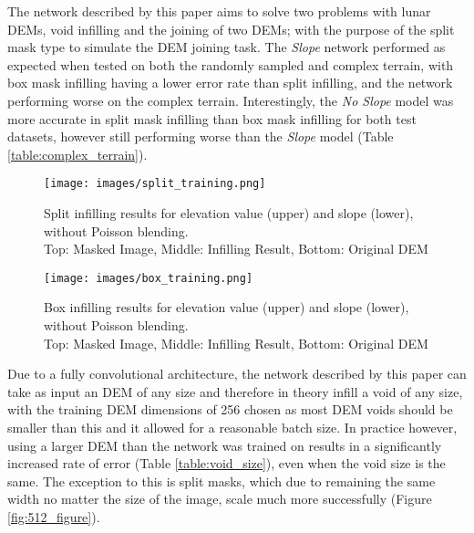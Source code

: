 \documentclass[twocolumn]{article}
\begin{document}
The network described by this paper aims to solve two problems with lunar DEMs, void infilling and the joining of two DEMs; with the purpose of the split mask type to simulate the DEM joining task.
The \emph{Slope} network performed as expected when tested on both the randomly sampled and complex terrain, with box mask infilling having a lower error rate than split infilling, and the network performing worse on the complex terrain.
Interestingly, the \emph{No Slope} model was more accurate in split mask infilling than box mask infilling for both test datasets, however still performing worse than the \emph{Slope} model (Table \ref{table:complex_terrain}).

\begin{figure*}
  \centering
  \texttt{[image: images/split\_training.png]}
  \captionsetup{justification=centering}
  \caption{Split infilling results for elevation value (upper) and slope (lower), without Poisson blending. \\ Top: Masked Image, Middle: Infilling Result,  Bottom: Original DEM}
  \label{fig:split_training}
\end{figure*}

\begin{figure*}
  \centering
  \texttt{[image: images/box\_training.png]}
  \captionsetup{justification=centering}
  \caption{Box infilling results for elevation value (upper) and slope (lower), without Poisson blending. \\ Top: Masked Image, Middle: Infilling Result,  Bottom: Original DEM}
  \label{fig:box_training}
\end{figure*}

Due to a fully convolutional architecture, the network described by this paper can take as input an DEM of any size and therefore in theory infill a void of any size, with the training DEM dimensions of 256 chosen as most DEM voids should be smaller than this and it allowed for a reasonable batch size.
In practice however, using a larger DEM than the network was trained on results in a significantly increased rate of error (Table \ref{table:void_size}), even when the void size is the same.
The exception to this is split masks, which due to remaining the same width no matter the size of the image, scale much more successfully (Figure \ref{fig:512_figure}).
\end{document}
